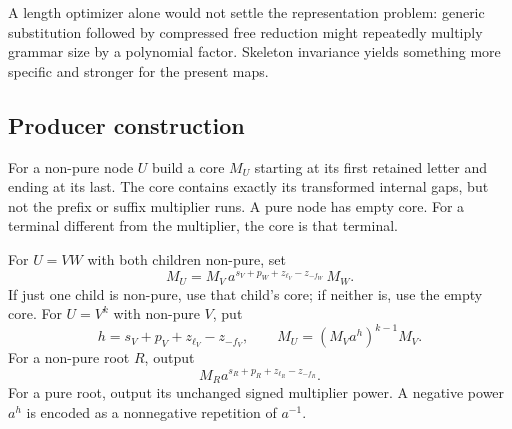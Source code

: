\documentclass[11pt,letterpaper]{article}
\theoremstyle{definition}
\theoremstyle{remark}\newtheorem{remark}[theorem]{Remark}
\begin{document}
A length optimizer alone would not settle the representation problem: generic
substitution followed by compressed free reduction might repeatedly multiply
grammar size by a polynomial factor. Skeleton invariance yields something
more specific and stronger for the present maps.

\subsection{Producer construction}

For a non-pure node $U$ build a core $M_U$ starting at its first retained
letter and ending at its last. The core contains exactly its transformed
internal gaps, but not the prefix or suffix multiplier runs. A pure node has
empty core. For a terminal different from the multiplier, the core is that
terminal.

For $U=VW$ with both children non-pure, set
\begin{equation}
 M_U=M_V\,a^{s_V+p_W+z_{\ell_V}-z_{-f_W}}\,M_W.
 \label{eq:coreconcat}
\end{equation}
If just one child is non-pure, use that child's core; if neither is, use the
empty core. For $U=V^k$ with non-pure $V$, put
\begin{equation}
 h=s_V+p_V+z_{\ell_V}-z_{-f_V},\qquad
 M_U=(M_Va^h)^{k-1}M_V.
 \label{eq:corepower}
\end{equation}
For a non-pure root $R$, output
\begin{equation}
 M_R a^{s_R+p_R+z_{\ell_R}-z_{-f_R}}.
 \label{eq:rootimage}
\end{equation}
For a pure root, output its unchanged signed multiplier power. A negative
power $a^h$ is encoded as a nonnegative repetition of $a^{-1}$.
\end{document}
